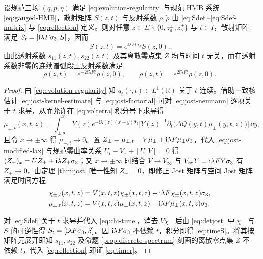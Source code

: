 \begin{proposition}\label{prop:evolution}
设规范三场 $(q,p,\eta)$ 满足 \eqref{eq:evolution-regularity} 与规范 HMB 系统 \eqref{eq:gauged-HMB}，散射矩阵 $S(z,t)$ 与反射系数 $\rho,\widetilde\rho$ 由 \eqref{eq:Sdef}--\eqref{eq:Sdef-matrix} 与 \eqref{eq:reflection} 定义。则对任意 $z\in\Sigma\mathbin{\backslash}\{0,z_a^\pm,z_b^\pm\}$ 与 $t\in I$，散射矩阵满足 $S_t=[\mathrm{i}\lambda F\sigma_3,S]$，因而
\begin{equation}\label{eq:timeS}
S(z,t)=e^{\ii\lambda Ft\widehat{\sigma}_3}S(z,0).
\end{equation}
由此透射系数 $s_{11}(z,t),s_{22}(z,t)$ 及其离散零点集 $Z$ 均与时间 $t$ 无关，而在透射系数非零的连续谱弧段上反射系数满足
\begin{equation}\label{eq:timer}
\rho(z,t)=e^{-2\ii\lambda Ft}\rho(z,0),\qquad
\widetilde\rho(z,t)=e^{2\ii\lambda Ft}\widetilde\rho(z,0).
\end{equation}
\end{proposition}
\begin{proof}
由 \eqref{eq:evolution-regularity} 知 $q_t(\cdot,t)\in L^1(\mathbb R)$ 关于 $t$ 连续。借助一致核估计 \eqref{eq:jost-kernel-estimate} 与 \eqref{eq:jost-factorial} 可对 \eqref{eq:jost-neumann} 逐项关于 $t$ 求导，从而允许在 \eqref{eq:volterra} 积分号下求导得
\begin{equation}\label{eq:volterra-t}
\mu_{\pm,t}(x,t,z)=\int_{\pm\infty}^{x}
Y(z)e^{-\ii\lambda(z)(x-y)\widehat{\sigma}_3}\!\bigl[
Y(z)^{-1}\partial_t\bigl(\Delta Q(y,t)\mu_\pm(y,t,z)\bigr)\bigr]\,\dd y,
\end{equation}
且令 $x\to\pm\infty$ 得 $\mu_{\pm,t}\to0$。置 $Z_\pm=\mu_{\pm,t}-V\mu_\pm+\mathrm{i}\lambda F\mu_\pm\sigma_3$，代入 \eqref{eq:jost-modified-lax} 与规范零曲率关系 $U_t-V_x+[U,V]=0$ 得 $(Z_\pm)_x=UZ_\pm+\mathrm{i}\lambda Z_\pm\sigma_3$；又 $x\to\pm\infty$ 时结合 $V\to V_\infty$ 与 $V_\infty Y=\mathrm{i}\lambda FY\sigma_3$ 有 $Z_\pm\to0$，由定理 \ref{thm:jost} 唯一性知 $Z_\pm=0$，即修正 Jost 矩阵与空间 Jost 矩阵满足时间方程
\begin{align}
&\chi_{\pm,t}(x,t,z)=V(x,t,z)\chi_\pm(x,t,z)-\mathrm{i}\lambda F\chi_\pm(x,t,z)\sigma_3,\label{eq:chi-time}\\
&\mu_{\pm,t}(x,t,z)=V(x,t,z)\mu_\pm(x,t,z)-\mathrm{i}\lambda F\mu_\pm(x,t,z)\sigma_3.\label{eq:mu-time}
\end{align}

对 \eqref{eq:Sdef} 关于 $t$ 求导并代入 \eqref{eq:chi-time}，消去 $V\chi_-$ 后由 \eqref{eq:detjost} 中 $\chi_-$ 与 $S$ 的可逆性得 $S_t=[\mathrm{i}\lambda F\sigma_3,S]$。因 $\mathrm{i}\lambda F\sigma_3$ 不依赖 $t$，积分即得 \eqref{eq:timeS}。将其按矩阵元展开即知 $s_{11},s_{22}$ 及命题 \ref{prop:discrete-spectrum} 刻画的离散零点集 $Z$ 不依赖 $t$，代入 \eqref{eq:reflection} 即证 \eqref{eq:timer}。
\end{proof}

